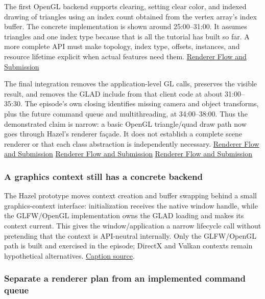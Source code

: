 The first OpenGL backend supports clearing, setting clear color, and indexed drawing of triangles using an index count obtained from the vertex array's index buffer. The concrete implementation is shown around 25:00--31:00. It assumes triangles and one index type because that is all the tutorial has built so far. A more complete API must make topology, index type, offsets, instances, and resource lifetime explicit when actual features need them. \href{https://www.youtube.com/watch?v=akxevYYWd9g&t=1500s}{Renderer Flow and Submission}

The final integration removes the application-level GL calls, preserves the visible result, and removes the GLAD include from that client code at about 31:00--35:30. The episode's own closing identifies missing camera and object transforms, plus the future command queue and multithreading, at 34:00--38:00. Thus the demonstrated claim is narrow: a basic OpenGL triangle/quad draw path now goes through Hazel's renderer façade. It does not establish a complete scene renderer or that each class abstraction is independently necessary. \href{https://www.youtube.com/watch?v=akxevYYWd9g&t=1860s}{Renderer Flow and Submission} \href{https://www.youtube.com/watch?v=akxevYYWd9g&t=2040s}{Renderer Flow and Submission} \href{https://www.youtube.com/watch?v=akxevYYWd9g&t=2220s}{Renderer Flow and Submission}

\subsubsection{A graphics context still has a concrete backend}\label{06-engine-ii-ch025-a-graphics-context-still-has-a-concrete-backend}

\hypertarget{06-engine-ii-ch025-a-graphics-context-still-has-a-concrete-backend}{}

The Hazel prototype moves context creation and buffer swapping behind a small graphics-context interface: initialization receives the native window handle, while the GLFW/OpenGL implementation owns the GLAD loading and makes its context current. This gives the window/application a narrow lifecycle call without pretending that the context is API-neutral internally. Only the GLFW/OpenGL path is built and exercised in the episode; DirectX and Vulkan contexts remain hypothetical alternatives. \href{https://www.youtube.com/watch?v=YZKEjaCnsjU}{Caption source}.

\subsubsection{Separate a renderer plan from an implemented command queue}\label{06-engine-ii-ch025-separate-a-renderer-plan-from-an-implemented-command-queue}

